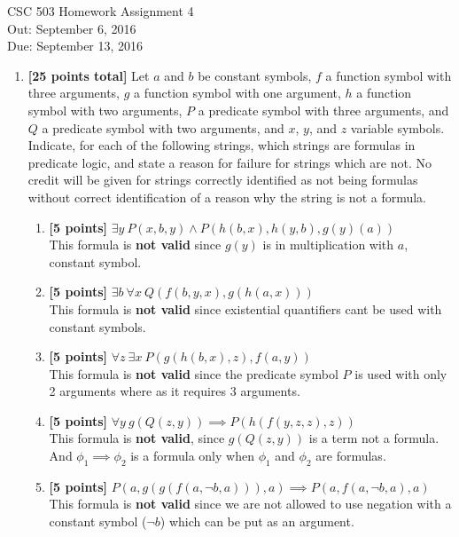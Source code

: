 \documentclass{article}
\begin{document}
\begin{center}
  {\LARGE CSC 503 Homework Assignment 4}\\[1pc]
  Out: September 6, 2016 \\
  Due: September 13, 2016 \\
\end{center}

\begin{enumerate}

\item \textbf{[25 points total]} Let $a$ and $b$ be constant symbols,
  $f$ a function symbol with three arguments,
  $g$ a function symbol with one argument,
  $h$ a function symbol with two arguments,
  $P$ a predicate symbol with three arguments, and
  $Q$ a predicate symbol with two arguments, and
  $x$, $y$, and $z$ variable symbols.
  Indicate, for each of the following strings, which strings are
  formulas in predicate logic, and state a reason for failure for
  strings which are not.
  No credit will be given for strings correctly identified as not
  being formulas without correct identification of a reason why the
  string is not a formula.
  \begin{enumerate}
  \item \textbf{[5 points]} $\exists y\ P(x,b,y) \land P(h(b,x),h(y,b),g(y)(a))$\\
  This formula is \textbf{not valid} since $g(y)$ is in multiplication with $a$, constant symbol.

  \item \textbf{[5 points]} $\exists b\ \forall x\ Q(f(b,y,x),g(h(a,x)))$\\
  This formula is \textbf{not valid} since existential quantifiers cant be used with constant symbols.

  \item \textbf{[5 points]} $\forall z\ \exists x\ P(g(h(b,x),z),f(a,y))$\\
  This formula is \textbf{not valid} since the predicate symbol $P$ is used with only 2 arguments where as it  requires 3 arguments.

  \item \textbf{[5 points]} $\forall y\ g(Q(z,y)) \implies P(h(f(y,z,z),z))$\\
  This formula is \textbf{not valid}, since $g(Q(z,y))$ is a term not a formula. And $\phi_1 \implies \phi_2$ is a formula only when $\phi_1$ and $\phi_2$ are formulas.

  \item \textbf{[5 points]}
    $P(a,g(g(f(a,\neg b, a))),a) \implies P(a,f(a,\neg b, a),a)$\\
    This formula is \textbf{not valid} since we are not allowed to use negation with a constant symbol ($\neg b$) which can be put as an argument.


\end{enumerate}
\end{enumerate}
\end{document}
